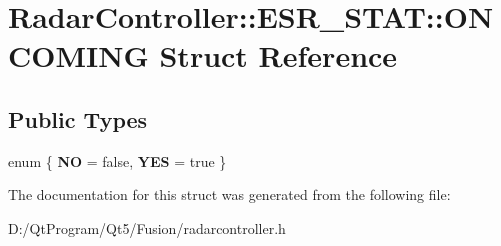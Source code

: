 \hypertarget{struct_radar_controller_1_1_e_s_r___s_t_a_t_1_1_o_n_c_o_m_i_n_g}{}\section{Radar\+Controller\+:\+:E\+S\+R\+\_\+\+S\+T\+A\+T\+:\+:O\+N\+C\+O\+M\+I\+N\+G Struct Reference}
\label{struct_radar_controller_1_1_e_s_r___s_t_a_t_1_1_o_n_c_o_m_i_n_g}
\subsection*{Public Types}
\begin{DoxyCompactItemize}
\item 
\hypertarget{struct_radar_controller_1_1_e_s_r___s_t_a_t_1_1_o_n_c_o_m_i_n_g_af5034e800ce0a23b07afe148745d4b0d}{}enum \{ {\bfseries N\+O} = false, 
{\bfseries Y\+E\+S} = true
 \}\label{struct_radar_controller_1_1_e_s_r___s_t_a_t_1_1_o_n_c_o_m_i_n_g_af5034e800ce0a23b07afe148745d4b0d}

\end{DoxyCompactItemize}


The documentation for this struct was generated from the following file\+:\begin{DoxyCompactItemize}
\item 
D\+:/\+Qt\+Program/\+Qt5/\+Fusion/radarcontroller.\+h\end{DoxyCompactItemize}
